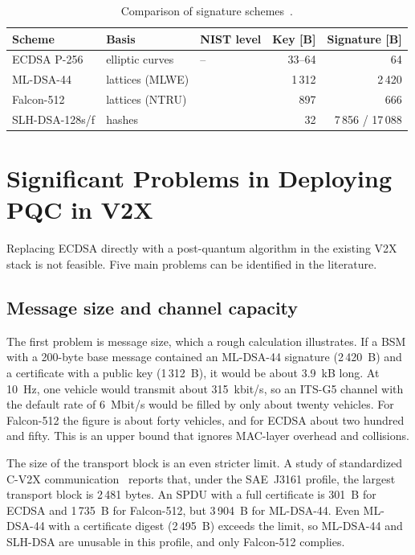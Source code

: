 \documentclass[10pt,twoside,a4paper]{article}
\begin{document}
\begin{table}[tbh]
\centering\small
\caption{Comparison of signature schemes~\cite{NIST:FIPS204,NIST:FIPS205,Fouque:Falcon}.}
\label{t:schemes}
\begin{tabular}{@{}>{\raggedright\arraybackslash}p{2.7cm}>{\raggedright\arraybackslash}p{2.7cm}>{\raggedright\arraybackslash}p{1.6cm}rr@{}}
\toprule
\textbf{Scheme} & \textbf{Basis} & \textbf{NIST level} & \textbf{Key [B]} & \textbf{Signature [B]}\\
\midrule
ECDSA P-256 & elliptic curves & -- & 33--64 & 64\\
ML-DSA-44 & lattices (MLWE) & 2 & 1\,312 & 2\,420\\
Falcon-512 & lattices (NTRU) & 1 & 897 & 666\\
SLH-DSA-128s/f & hashes & 1 & 32 & 7\,856 / 17\,088\\
\bottomrule
\end{tabular}
\end{table}

\section{Significant Problems in Deploying PQC in V2X} \label{problemy}

Replacing ECDSA directly with a post-quantum algorithm in the existing V2X stack is not feasible. Five main problems can be identified in the literature.

\subsection{Message size and channel capacity}

The first problem is message size, which a rough calculation illustrates. If a BSM with a 200-byte base message contained an ML-DSA-44 signature (2\,420~B) and a certificate with a public key (1\,312~B), it would be about 3.9~kB long. At 10~Hz, one vehicle would transmit about 315~kbit/s, so an ITS-G5 channel with the default rate of 6~Mbit/s would be filled by only about twenty vehicles. For Falcon-512 the figure is about forty vehicles, and for ECDSA about two hundred and fifty. This is an upper bound that ignores MAC-layer overhead and collisions.

The size of the transport block is an even stricter limit. A study of standardized C-V2X communication~\cite{Abrar:2026} reports that, under the SAE~J3161 profile, the largest transport block is 2\,481 bytes. An SPDU with a full certificate is 301~B for ECDSA and 1\,735~B for Falcon-512, but 3\,904~B for ML-DSA-44. Even ML-DSA-44 with a certificate digest (2\,495~B) exceeds the limit, so ML-DSA-44 and SLH-DSA are unusable in this profile, and only Falcon-512 complies.
\end{document}
